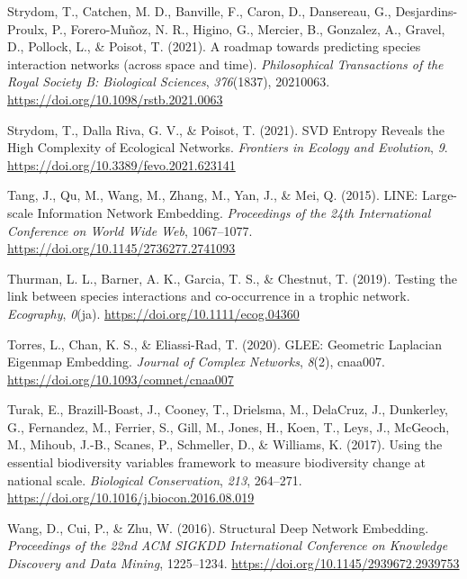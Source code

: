 \documentclass[10pt,oneside]{article}
\newlength{\cslhangindent}
\newenvironment{CSLReferences}[2] %
 {%
  \setlength{\parindent}{0pt}
  \ifodd #1 \everypar{\setlength{\hangindent}{\cslhangindent}}\ignorespaces\fi
  \ifnum #2 > 0
  \setlength{\parskip}{#2\baselineskip}
  \fi
 }%
 {}
\begin{document}
\begin{CSLReferences}{1}{0}
\leavevmode{}%
Strydom, T., Catchen, M. D., Banville, F., Caron, D., Dansereau, G.,
Desjardins-Proulx, P., Forero-Muñoz, N. R., Higino, G., Mercier, B.,
Gonzalez, A., Gravel, D., Pollock, L., \& Poisot, T. (2021). A roadmap
towards predicting species interaction networks (across space and time).
\emph{Philosophical Transactions of the Royal Society B: Biological
Sciences}, \emph{376}(1837), 20210063.
\url{https://doi.org/10.1098/rstb.2021.0063}

\leavevmode{}%
Strydom, T., Dalla Riva, G. V., \& Poisot, T. (2021). SVD Entropy
Reveals the High Complexity of Ecological Networks. \emph{Frontiers in
Ecology and Evolution}, \emph{9}.
\url{https://doi.org/10.3389/fevo.2021.623141}

\leavevmode{}%
Tang, J., Qu, M., Wang, M., Zhang, M., Yan, J., \& Mei, Q. (2015). LINE:
Large-scale Information Network Embedding. \emph{Proceedings of the 24th
International Conference on World Wide Web}, 1067--1077.
\url{https://doi.org/10.1145/2736277.2741093}

\leavevmode{}%
Thurman, L. L., Barner, A. K., Garcia, T. S., \& Chestnut, T. (2019).
Testing the link between species interactions and co-occurrence in a
trophic network. \emph{Ecography}, \emph{0}(ja).
\url{https://doi.org/10.1111/ecog.04360}

\leavevmode{}%
Torres, L., Chan, K. S., \& Eliassi-Rad, T. (2020). GLEE: Geometric
Laplacian Eigenmap Embedding. \emph{Journal of Complex Networks},
\emph{8}(2), cnaa007. \url{https://doi.org/10.1093/comnet/cnaa007}

\leavevmode{}%
Turak, E., Brazill-Boast, J., Cooney, T., Drielsma, M., DelaCruz, J.,
Dunkerley, G., Fernandez, M., Ferrier, S., Gill, M., Jones, H., Koen,
T., Leys, J., McGeoch, M., Mihoub, J.-B., Scanes, P., Schmeller, D., \&
Williams, K. (2017). Using the essential biodiversity variables
framework to measure biodiversity change at national scale.
\emph{Biological Conservation}, \emph{213}, 264--271.
\url{https://doi.org/10.1016/j.biocon.2016.08.019}

\leavevmode{}%
Wang, D., Cui, P., \& Zhu, W. (2016). Structural Deep Network Embedding.
\emph{Proceedings of the 22nd ACM SIGKDD International Conference on
Knowledge Discovery and Data Mining}, 1225--1234.
\url{https://doi.org/10.1145/2939672.2939753}


\end{CSLReferences}
\end{document}
